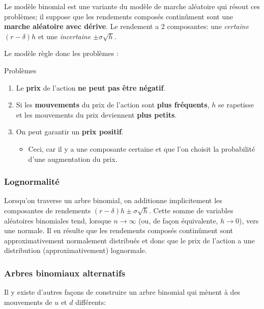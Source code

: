 \documentclass[10pt, french]{article}
\begin{document}
\begin{multicols*}{2}


Le modèle binomial est une variante du modèle de marche aléatoire qui résout ces problèmes; il suppose que les rendements composés continûment sont une \textbf{marche aléatoire avec dérive}. 
Le rendement a 2 composantes: une \textit{certaine} $(r - \delta)h$ et une \textit{incertaine} $\pm \sigma \sqrt{h}$.

Le modèle règle donc les problèmes :
\begin{conceptgen}{Problèmes}
\begin{enumerate}[leftmargin = *]
	\item	Le \textbf{prix} de l'action \textbf{ne peut pas être négatif}.
	\item	Si les \textbf{mouvements} du prix de l'action sont \textbf{plus fréquents}, $h$ se rapetisse et les mouvements du prix deviennent \textbf{plus petits}. 
	\item	On peut garantir un \textbf{prix positif}. 
		\begin{itemize}[leftmargin = *]
		\item	Ceci, car il y a une composante certaine et que l'on choisit la probabilité d'une augmentation du prix.
		\end{itemize}
\end{enumerate}
\end{conceptgen}

\subsubsection*{Lognormalité}


Lorsqu'on traverse un arbre binomial, on additionne implicitement les composantes de rendements $(r - \delta)h \pm \sigma \sqrt{h}$. Cette somme de variables aléatoires binomiales tend, lorsque $n \rightarrow \infty$ (ou, de façon équivalente, $h \rightarrow 0$), vers une normale.
Il en résulte que les rendements composés continûment sont approximativement normalement distribués et donc que le prix de l'action a une distribution (approximativement) lognormale.

\subsubsection*{Arbres binomiaux alternatifs}
Il y existe d'autres façons de construire un arbre binomial qui mènent à des mouvements de $u$ et $d$ différents:


\end{multicols*}
\end{document}
